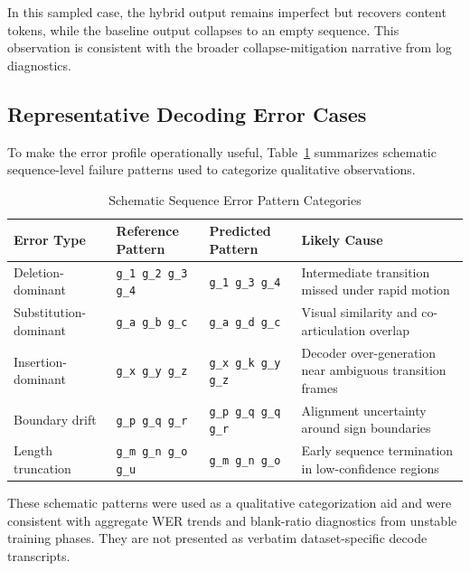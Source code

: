 \noindent In this sampled case, the hybrid output remains imperfect but recovers content tokens, while the baseline output collapses to an empty sequence. This observation is consistent with the broader collapse-mitigation narrative from log diagnostics.

\subsection{Representative Decoding Error Cases}

To make the error profile operationally useful, Table~\ref{tab:error_cases} summarizes schematic sequence-level failure patterns used to categorize qualitative observations.

\begin{table}[H]
\centering
\caption{Schematic Sequence Error Pattern Categories}
\label{tab:error_cases}
\begingroup
\small
\setlength{\tabcolsep}{4pt}
\begin{tabularx}{\textwidth}{@{}p{2.6cm}p{3.1cm}p{3.1cm}X@{}}
\toprule
\textbf{Error Type} & \textbf{Reference Pattern} & \textbf{Predicted Pattern} & \textbf{Likely Cause} \\
\midrule
Deletion-dominant & \texttt{g\_1 g\_2 g\_3 g\_4} & \texttt{g\_1 g\_3 g\_4} & Intermediate transition missed under rapid motion \\

Substitution-dominant & \texttt{g\_a g\_b g\_c} & \texttt{g\_a g\_d g\_c} & Visual similarity and co-articulation overlap \\

Insertion-dominant & \texttt{g\_x g\_y g\_z} & \texttt{g\_x g\_k g\_y g\_z} & Decoder over-generation near ambiguous transition frames \\

Boundary drift & \texttt{g\_p g\_q g\_r} & \texttt{g\_p g\_q g\_q g\_r} & Alignment uncertainty around sign boundaries \\

Length truncation & \texttt{g\_m g\_n g\_o g\_u} & \texttt{g\_m g\_n g\_o} & Early sequence termination in low-confidence regions \\
\bottomrule
\end{tabularx}
\endgroup
\end{table}

\noindent These schematic patterns were used as a qualitative categorization aid and were consistent with aggregate WER trends and blank-ratio diagnostics from unstable training phases. They are not presented as verbatim dataset-specific decode transcripts.

